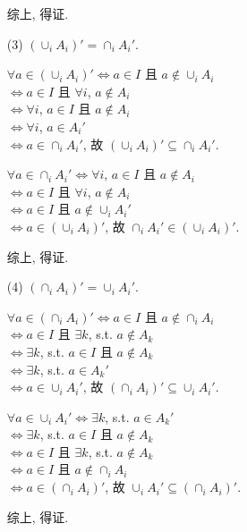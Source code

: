 \documentclass{note}
\begin{document}
\begin{itemize}
\begin{pf}
        综上, 得证.
    \end{pf}
    \item[(3)] $(\cup_iA_i)'=\cap_iA_i'$.
    \begin{pf}
        $\forall a\in(\cup_iA_i)'\Longleftrightarrow a\in I$ 且 $a\notin\cup_iA_i$\\
        $\Longleftrightarrow a\in I$ 且 $\forall i$, $a\notin A_i$\\
        $\Longleftrightarrow\forall i$, $a\in I$ 且 $a\notin A_i$\\
        $\Longleftrightarrow\forall i$, $a\in A_i'$\\
        $\Longleftrightarrow a\in\cap_iA_i'$, 故 $(\cup_iA_i)'\subseteq\cap_iA_i'$.

        $\forall a\in\cap_iA_i'\Longleftrightarrow\forall i$, $a\in I$ 且 $a\notin A_i$\\
        $\Longleftrightarrow a\in I$ 且 $\forall i$, $a\notin A_i$\\
        $\Longleftrightarrow a\in I$ 且 $a\notin\cup_iA_i'$\\
        $\Longleftrightarrow a\in(\cup_iA_i)'$, 故 $\cap_iA_i'\in(\cup_iA_i)'$.

        综上, 得证.
    \end{pf}
    \item[(4)] $(\cap_iA_i)'=\cup_iA_i'$.
    \begin{pf}
        $\forall a\in(\cap_iA_i)'\Longleftrightarrow a\in I$ 且 $a\notin\cap_iA_i$\\
        $\Longleftrightarrow a\in I$ 且 $\exists k$, s.t. $a\notin A_k$\\
        $\Longleftrightarrow\exists k$, s.t. $a\in I$ 且 $a\notin A_k$\\
        $\Longleftrightarrow\exists k$, s.t. $a\in A_k'$\\
        $\Longleftrightarrow a\in\cup_iA_i'$, 故 $(\cap_iA_i)'\subseteq\cup_iA_i'$.

        $\forall a\in\cup_iA_i'\Longleftrightarrow\exists k$, s.t. $a\in A_k'$\\
        $\Longleftrightarrow\exists k$, s.t. $a\in I$ 且 $a\notin A_k$\\
        $\Longleftrightarrow a\in I$ 且 $\exists k$, s.t. $a\notin A_k$\\
        $\Longleftrightarrow a\in I$ 且 $a\notin\cap_iA_i$\\
        $\Longleftrightarrow a\in(\cap_iA_i)'$, 故 $\cup_iA_i'\subseteq(\cap_iA_i)'$.

        综上, 得证.
    \end{pf}
\end{itemize}
\end{document}
